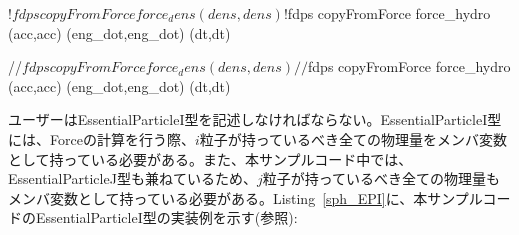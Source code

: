 \endifC
{}
\ifFtn%
\begin{screen}
\begin{spverbatim}
!$fdps copyFromForce force_dens (dens,dens)
!$fdps copyFromForce force_hydro (acc,acc) (eng_dot,eng_dot) (dt,dt)
\end{spverbatim}
\end{screen}
\endifFtn
\ifC%
\begin{screen}
\begin{spverbatim}
//$fdps copyFromForce force_dens (dens,dens)
//$fdps copyFromForce force_hydro (acc,acc) (eng_dot,eng_dot) (dt,dt)
\end{spverbatim}
\end{screen}
\endifC

ユーザーはEssentialParticleI型を記述しなければならない。EssentialParticleI型には、Forceの計算を行う際、$i$粒子が持っているべき全ての物理量をメンバ変数として持っている必要がある。また、本サンプルコード中では、EssentialParticleJ型も兼ねているため、$j$粒子が持っているべき全ての物理量もメンバ変数として持っている必要がある。Listing~\ref{sph_EPI}に、本サンプルコードのEssentialParticleI型の実装例を示す(参照):

\ifCpp%

\endifCpp
\ifFtn%

\endifFtn
\ifC%

\endifC

